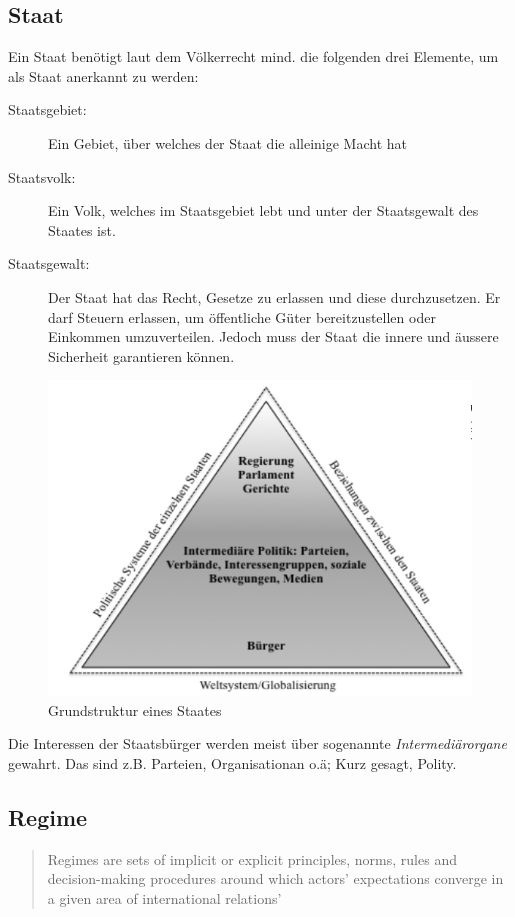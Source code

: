 \documentclass[a4paper, 11pt]{article}
\begin{document}
\subsection{Staat}
Ein Staat benötigt laut dem Völkerrecht mind. die folgenden drei Elemente, um als Staat anerkannt zu werden: 
\begin{description}
    \item[Staatsgebiet: ] Ein Gebiet, über welches der Staat die alleinige Macht hat
    \item[Staatsvolk: ] Ein Volk, welches im Staatsgebiet lebt und unter der Staatsgewalt des Staates ist.
    \item[Staatsgewalt: ] Der Staat hat das Recht, Gesetze zu erlassen und diese durchzusetzen. Er darf Steuern erlassen, um öffentliche Güter bereitzustellen oder Einkommen umzuverteilen. Jedoch muss der Staat die innere und äussere Sicherheit garantieren können.
\end{description}

\begin{figure}[htb]
    \centering
    \includegraphics[keepaspectratio=true,height=15\baselineskip]{analytische_grundstruktur.png}
    \caption{Grundstruktur eines Staates}
    \label{fig:grundstrk_staat}
\end{figure}

Die Interessen der Staatsbürger werden meist über sogenannte \textit{Intermediärorgane} gewahrt. Das sind z.B. Parteien, Organisationan o.ä; Kurz gesagt, Polity.

\subsection{Regime} \label{sec:Regime}
\begin{quote}
    \begin{blockquote}[Krasner 1983]{Regimes are sets of implicit or explicit principles, norms, rules and decision-making procedures around which actors' expectations converge in a given area of international relations'}
    \end{blockquote}
\end{quote}
\end{document}
